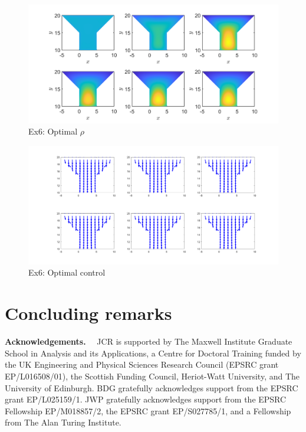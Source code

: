 \documentclass[final]{siamltex}
\begin{document}
\begin{figure}[h]
	\centering
	\includegraphics[scale=0.25]{MultiOpt1.png}
	\caption{Ex6: Optimal $\rho$} 
	\label{FM1}
\end{figure}
\begin{figure}[h]
	\centering
	\includegraphics[scale=0.25]{MultiCont1.png}
	\caption{Ex6: Optimal control} 
	\label{FM2}
\end{figure}


\section{Concluding remarks}\label{sec:Conc}


\textbf{Acknowledgements.}~~
JCR is supported by The Maxwell Institute Graduate School in Analysis and
its Applications, a Centre for Doctoral Training funded by the UK Engineering and Physical Sciences Research Council (EPSRC grant EP/L016508/01), the Scottish Funding Council, Heriot-Watt University, and The University of Edinburgh.
%
BDG gratefully acknowledges support from the EPSRC grant EP/L025159/1.
%
JWP gratefully acknowledges support from the EPSRC Fellowship EP/M018857/2, the EPSRC grant EP/S027785/1, and a Fellowship from The Alan Turing Institute. 




\end{document}

